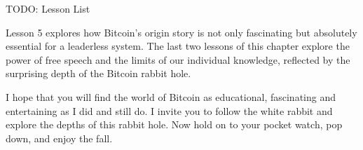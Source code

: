 TODO: Lesson List

Lesson 5 explores how Bitcoin's origin story is not only fascinating but
absolutely essential for a leaderless system. The last two lessons of this
chapter explore the power of free speech and the limits of our individual
knowledge, reflected by the surprising depth of the Bitcoin rabbit hole.

I hope that you will find the world of Bitcoin as educational, fascinating and
entertaining as I did and still do. I invite you to follow the white rabbit and
explore the depths of this rabbit hole. Now hold on to your pocket watch, pop
down, and enjoy the fall.
